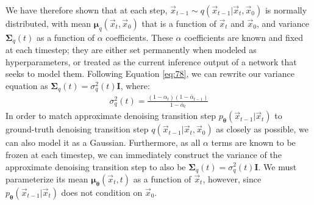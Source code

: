 We have therefore shown that at each step, $\vec{x}_{t-1} \sim q(\vec{x}_{t-1}| \vec{x}_t, \vec{x}_0)$ is normally distributed, with mean $\bm{\mu}_q(\vec{x}_t, \vec{x}_0)$ that is a function of $\vec{x}_t$ and $\vec{x}_0$, and variance $\bm{\Sigma}_q(t)$ as a function of $\alpha$ coefficients.  These $\alpha$ coefficients are known and fixed at each timestep; they are either set permanently when modeled as hyperparameters, or treated as the current inference output of a network that seeks to model them.  Following Equation \ref{eq:78}, we can rewrite our variance equation as $\bm{\Sigma}_q(t) = \sigma_q^2(t)\textbf{I}$, where:
\begin{align}
    \sigma_q^2(t) = \frac{(1 - \alpha_t)(1 - \bar\alpha_{t-1})}{1 -\bar\alpha_{t}} \label{eq:79}
\end{align}
In order to match approximate denoising transition step $p_{\bm{\theta}}(\vec{x}_{t-1}|\vec{x}_t)$ to ground-truth denoising transition step $q(\vec{x}_{t-1}| \vec{x}_t, \vec{x}_0)$ as closely as possible, we can also model it as a Gaussian.  Furthermore, as all $\alpha$ terms are known to be frozen at each timestep, we can immediately construct the variance of the approximate denoising transition step to also be $\bm{\Sigma}_q(t) = \sigma_q^2(t)\textbf{I}$.  We must parameterize its mean $\bm{\mu}_{\bm{\theta}}(\vec{x}_t, t)$ as a function of $\vec{x}_t$, however, since $p_{\bm{\theta}}(\vec{x}_{t-1}|\vec{x}_t)$ does not condition on $\vec{x}_0$.

